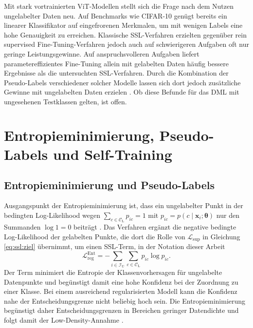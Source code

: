 Mit stark vortrainierten \ac{ViT}-Modellen stellt sich die Frage nach dem Nutzen ungelabelter Daten neu. Auf Benchmarks wie CIFAR-10 genügt bereits ein linearer Klassifikator auf eingefrorenen Merkmalen, um mit wenigen Labels eine hohe Genauigkeit zu erreichen. Klassische \ac{SSL}-Verfahren erzielten gegenüber rein supervised Fine-Tuning-Verfahren jedoch auch auf schwierigeren Aufgaben oft nur geringe Leistungsgewinne. Auf anspruchsvolleren Aufgaben liefert parametereffizientes Fine-Tuning allein mit gelabelten Daten häufig bessere Ergebnisse als die untersuchten \ac{SSL}-Verfahren. Durch die Kombination der Pseudo-Labels verschiedener solcher Modelle lassen sich dort jedoch zusätzliche Gewinne mit ungelabelten Daten erzielen \cite{zhang_revisiting_2025}. Ob diese Befunde für das \ac{DML} mit ungesehenen Testklassen gelten, ist offen.

\section{Entropieminimierung, Pseudo-Labels und Self-Training}
\label{sec:selftraining}

\subsection{Entropieminimierung und Pseudo-Labels}
\label{sec:entropie}

Ausgangspunkt der Entropieminimierung ist, dass ein ungelabelter Punkt in der bedingten Log-Likelihood wegen $\sum_{c\in\mathcal{C}_{\mathrm{L}}}p_{ic}=1$ mit $p_{ic}=p(c\mid\bm{x}_i;\bm{\theta})$ nur den Summanden $\log 1=0$ beiträgt \cite{grandvalet_semi-supervised_2005}. Das Verfahren ergänzt die negative bedingte Log-Likelihood der gelabelten Punkte, die dort die Rolle von $\mathcal{L}_{\mathrm{sup}}$ in Gleichung \eqref{eq:ssl:ziel} übernimmt, um einen \ac{SSL}-Term, in der Notation dieser Arbeit \cite{grandvalet_semi-supervised_2005}
\begin{equation}
  \mathcal{L}_{\mathrm{reg}}^{\mathrm{Ent}}=-\sum_{i\in\mathcal{I}_{\mathrm{U}}}\sum_{c\in\mathcal{C}_{\mathrm{L}}}p_{ic}\log p_{ic}.
  \label{eq:entmin}
\end{equation}
Der Term minimiert die Entropie der Klassenvorhersagen für ungelabelte Datenpunkte und begünstigt damit eine hohe Konfidenz bei der Zuordnung zu einer Klasse. Bei einem ausreichend regularisierten Modell kann die Konfidenz nahe der Entscheidungsgrenze nicht beliebig hoch sein. Die Entropieminimierung begünstigt daher Entscheidungsgrenzen in Bereichen geringer Datendichte und folgt damit der Low-Density-Annahme \cite{grandvalet_semi-supervised_2005}.


